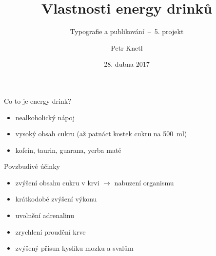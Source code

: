 \documentclass[pdf,blends]{prosper}
\title{Vlastnosti energy drinků}
\subtitle{Typografie a publikování \,--\, 5. projekt}
\author{Petr Knetl}
\date{28. dubna 2017}
\begin{document}
\maketitle
\begin{slide}{Co to je energy drink?}
\begin{itemize}
\item nealkoholický nápoj
\item vysoký obsah cukru (až patnáct kostek cukru na 500~ml)
\item kofein, taurin, guarana, yerba maté
\end{itemize}    
\begin{figure}[ht]
\begin{center}
\end{center}
\end{figure}
\end{slide}

\begin{slide}{Povzbudivé účinky}
\begin{itemize}
\item zvýšení obsahu cukru v krvi $\rightarrow$ nabuzení organismu
\item krátkodobé zvýšení výkonu
\item uvolnění adrenalinu
\item zrychlení proudění krve
\item zvýšený přísun kyslíku mozku a svalům
\end{itemize}    

\end{slide}
\end{document}
